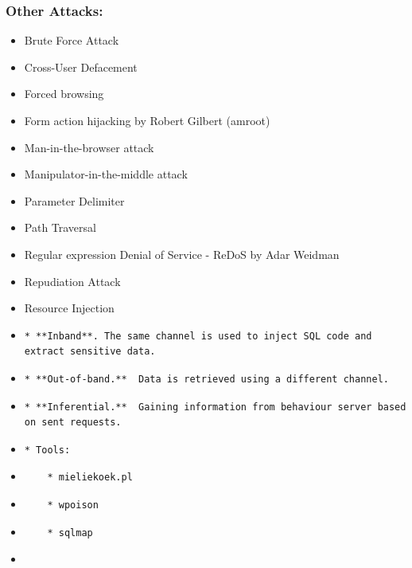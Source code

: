 \hypertarget{other-attacks}{%
\subsubsection{Other Attacks:}\label{other-attacks}}

\begin{itemize}
\item
  Brute Force Attack
\item
  Cross-User Defacement
\item
  Forced browsing
\item
  Form action hijacking by Robert Gilbert (amroot)
\item
  Man-in-the-browser attack
\item
  Manipulator-in-the-middle attack
\item
  Parameter Delimiter
\item
  Path Traversal
\item
  Regular expression Denial of Service - ReDoS by Adar Weidman
\item
  Repudiation Attack
\item
  Resource Injection
\item
\begin{verbatim}
* **Inband**. The same channel is used to inject SQL code and extract sensitive data.
\end{verbatim}
\item
\begin{verbatim}
* **Out-of-band.**  Data is retrieved using a different channel.
\end{verbatim}
\item
\begin{verbatim}
* **Inferential.**  Gaining information from behaviour server based on sent requests.
\end{verbatim}
\item
\begin{verbatim}
* Tools:
\end{verbatim}
\item
\begin{verbatim}
    * mieliekoek.pl
\end{verbatim}
\item
\begin{verbatim}
    * wpoison
\end{verbatim}
\item
\begin{verbatim}
    * sqlmap
\end{verbatim}
\item

\end{itemize}
